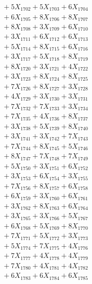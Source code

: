 \documentclass[a4paper,10pt]{article}
\begin{document}
{\begin{align}
&\;  + 5 X_{1702} + 5 X_{1703} + 6 X_{1704} \\[0.3ex]
&\;  + 6 X_{1705} + 8 X_{1706} + 8 X_{1707} \\[0.3ex]
&\;  + 8 X_{1708} + 3 X_{1709} + 6 X_{1710} \\[0.3ex]
&\;  + 3 X_{1711} + 6 X_{1712} + 6 X_{1713} \\[0.3ex]
&\;  + 5 X_{1714} + 8 X_{1715} + 6 X_{1716} \\[0.3ex]
&\;  + 3 X_{1717} + 5 X_{1718} + 8 X_{1719} \\[0.5ex]\allowbreak
&\;  + 8 X_{1720} + 3 X_{1721} + 4 X_{1722} \\[0.3ex]
&\;  + 3 X_{1723} + 8 X_{1724} + 8 X_{1725} \\[0.3ex]
&\;  + 7 X_{1726} + 8 X_{1727} + 3 X_{1728} \\[0.3ex]
&\;  + 4 X_{1729} + 3 X_{1730} + 3 X_{1731} \\[0.3ex]
&\;  + 7 X_{1732} + 7 X_{1733} + 3 X_{1734} \\[0.3ex]
&\;  + 7 X_{1735} + 4 X_{1736} + 8 X_{1737} \\[0.3ex]
&\;  + 3 X_{1738} + 5 X_{1739} + 8 X_{1740} \\[0.3ex]
&\;  + 3 X_{1741} + 3 X_{1742} + 7 X_{1743} \\[0.3ex]
&\;  + 7 X_{1744} + 8 X_{1745} + 5 X_{1746} \\[0.3ex]
&\;  + 8 X_{1747} + 7 X_{1748} + 7 X_{1749} \\[0.5ex]\allowbreak
&\;  + 5 X_{1750} + 3 X_{1751} + 6 X_{1752} \\[0.3ex]
&\;  + 3 X_{1753} + 6 X_{1754} + 3 X_{1755} \\[0.3ex]
&\;  + 7 X_{1756} + 8 X_{1757} + 6 X_{1758} \\[0.3ex]
&\;  + 6 X_{1759} + 3 X_{1760} + 6 X_{1761} \\[0.3ex]
&\;  + 3 X_{1762} + 8 X_{1763} + 6 X_{1764} \\[0.3ex]
&\;  + 3 X_{1765} + 3 X_{1766} + 5 X_{1767} \\[0.3ex]
&\;  + 6 X_{1768} + 5 X_{1769} + 8 X_{1770} \\[0.3ex]
&\;  + 7 X_{1771} + 5 X_{1772} + 3 X_{1773} \\[0.3ex]
&\;  + 5 X_{1774} + 7 X_{1775} + 4 X_{1776} \\[0.3ex]
&\;  + 7 X_{1777} + 4 X_{1778} + 4 X_{1779} \\[0.5ex]\allowbreak
&\;  + 7 X_{1780} + 4 X_{1781} + 4 X_{1782} \\[0.3ex]
&\;  + 6 X_{1783} + 6 X_{1784} + 6 X_{1785} \\[0.3ex]

\end{align}}
\end{document}
